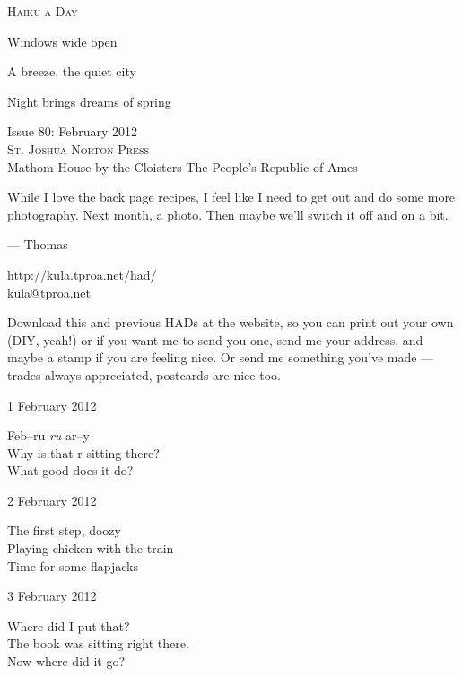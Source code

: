 \documentclass[12pt]{article}
\begin{document}
\begin{center}
{\fontsize{36}{48}\selectfont \textsc{Haiku a Day }}
\end{center}

\vspace*{3.5cm}

{\fontsize{20}{40}\selectfont 

Windows wide open

A breeze, the quiet city

Night brings dreams of spring

}

\vspace*{5.0cm}
\begin{center}
{\large{Issue 80: February 2012}} \\[5mm]
{\fontsize{8}{8}\selectfont  \textsc{ St. Joshua Norton Press }} \\[1mm]
{\fontsize{6}{6}\selectfont Mathom House by the Cloisters \textbar The People's Republic of Ames }
\end{center}


\newpage

While I love the back page recipes, I feel like I need to get out
and do some more photography. Next month, a photo. Then maybe
we'll switch it off and on a bit.

--- Thomas

http://kula.tproa.net/had/ \\
kula@tproa.net

Download this and previous HADs at the website, so you can
print out your own (DIY, yeah!) or if you want me to send
you one, send me your address, and maybe a stamp if you
are feeling nice. Or send me something you've made ---
trades always appreciated, postcards are nice too.

\vfill

1 February 2012

Feb--ru {\em ru} ar--y \\
Why is that r sitting there? \\
What good does it do?


\newpage

2 February 2012

The first step, doozy \\
Playing chicken with the train \\
Time for some flapjacks

3 February 2012

Where did I put that? \\
The book was sitting right there. \\
Now where did it go?
\end{document}
